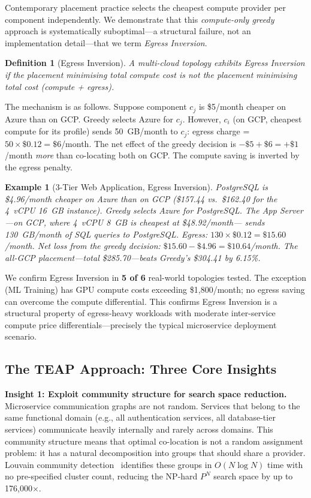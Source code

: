 \documentclass[10pt,journal]{IEEEtran}
\newtheorem{definition}{Definition}
\newtheorem{example}{Example}
\begin{document}
Contemporary placement practice selects the cheapest compute provider per component
independently.
We demonstrate that this \emph{compute-only greedy} approach is systematically
suboptimal---a structural failure, not an implementation detail---that we term
\emph{Egress Inversion}.

\begin{definition}[Egress Inversion]\label{def:inv}
A multi-cloud topology exhibits \emph{Egress Inversion} if the placement minimising
total compute cost is not the placement minimising total cost (compute + egress).
\end{definition}

The mechanism is as follows.
Suppose component $c_j$ is \$5/month cheaper on Azure than on GCP.
Greedy selects Azure for $c_j$.
However, $c_i$ (on GCP, cheapest compute for its profile) sends 50~GB/month to $c_j$:
egress charge = $50 \times \$0.12 = \$6$/month.
The net effect of the greedy decision is $-\$5 + \$6 = +\$1$/month \emph{more}
than co-locating both on GCP.
The compute saving is inverted by the egress penalty.

\begin{example}[3-Tier Web Application, Egress Inversion]\label{ex:3tier}
PostgreSQL is \$4.96/month cheaper on Azure than on GCP
(\$157.44 vs.\ \$162.40 for the 4~vCPU 16~GB instance).
Greedy selects Azure for PostgreSQL.
The App Server---on GCP, where 4~vCPU 8~GB is cheapest at \$48.92/month---
sends 130~GB/month of SQL queries to PostgreSQL.
Egress: $130 \times \$0.12 = \$15.60$/month.
Net loss from the greedy decision: $\$15.60 - \$4.96 = \mathbf{\$10.64}$/month.
The all-GCP placement---total \$285.70---beats Greedy's \$304.41 by 6.15\%.
\end{example}

We confirm Egress Inversion in \textbf{5 of 6} real-world topologies tested.
The exception (ML Training) has GPU compute costs exceeding \$1,800/month;
no egress saving can overcome the compute differential.
This confirms Egress Inversion is a structural property of egress-heavy workloads
with moderate inter-service compute price differentials---precisely the typical
microservice deployment scenario.

\subsection{The TEAP Approach: Three Core Insights}

\textbf{Insight 1: Exploit community structure for search space reduction.}
Microservice communication graphs are not random.
Services that belong to the same functional domain (e.g., all authentication services,
all database-tier services) communicate heavily internally and rarely across domains.
This community structure means that optimal co-location is not a random assignment
problem: it has a natural decomposition into groups that should share a provider.
Louvain community detection~\cite{blondel2008} identifies these groups in $O(N\log N)$
time with no pre-specified cluster count, reducing the NP-hard $P^N$ search space
by up to 176{,}000$\times$.
\end{document}
